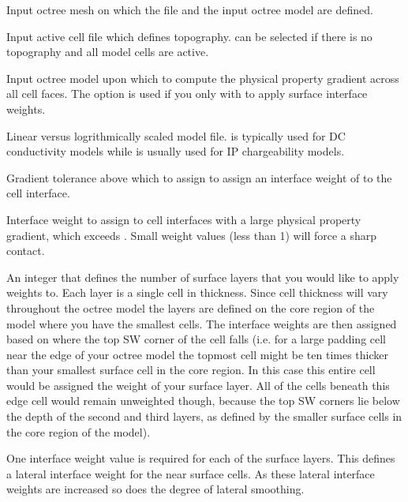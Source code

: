 \begin{description}[leftmargin=5cm, style=sameline, align=left]
\item[\fileName{input octree mesh}] Input octree mesh on which the  file and the input octree model are defined.
\item[\fileName{topography active cell}] Input active cell file which defines topography.  can be selected if there is no topography and all model cells are active.
\item[\fileName{input octree model}] Input octree model upon which to compute the physical property gradient across all cell faces. The  option is used if you only with to apply surface interface weights.
\item[\codeName{LOG\_MODEL \textbar LIN\_MODEL}] Linear versus logrithmically scaled model file.  is typically used for DC conductivity models while  is usually used for IP chargeability models.
\item[\codeName{gradtol}] Gradient tolerance above which to assign to assign an interface weight of  to the cell interface.  
\item[\codeName{weightedge}] Interface weight to assign to cell interfaces with a large physical property gradient, which exceeds . Small weight values (less than 1) will force a sharp contact.
\item[\codeName{\# of surface layers}] An integer that defines the number of surface layers that you would like to apply weights to. Each layer is a single cell in thickness. Since cell thickness will vary throughout the octree model the layers are defined on the core region of the model where you have the smallest cells. The interface weights are then assigned based on where the top SW corner of the cell falls (i.e. for a large padding cell near the edge of your octree model the topmost cell might be ten times thicker than your smallest surface cell in the core region. In this case this entire cell would be assigned the weight of your surface layer. All of the cells beneath this edge cell would remain unweighted though, because the top SW corners lie below the depth of the second and third layers, as defined by the smaller surface cells in the core region of the model). 
\item[\codeName{interface weight values}] One interface weight value is required for each of the surface layers. This defines a lateral interface weight for the near surface cells. As these lateral interface weights are increased so does the degree of lateral smoothing.  
\end{description}


